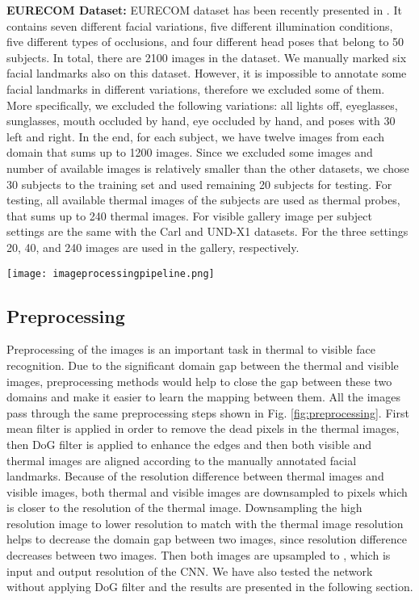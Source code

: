 \documentclass[conference]{IEEEtran}
\begin{document}
\textbf{EURECOM Dataset:} EURECOM dataset has been recently presented in \cite{eurecom}. It contains seven different facial variations, five different illumination conditions, five different types of occlusions, and four different head poses that belong to 50 subjects. In total, there are 2100 images in the dataset. We manually marked six facial landmarks also on this dataset. However, it is impossible to annotate some facial landmarks in different variations, therefore we excluded some of them. More specifically, we excluded the following variations: all lights off, eyeglasses, sunglasses, mouth occluded by hand, eye occluded by hand, and poses with 30 left and right. In the end, for each subject, we have twelve images from each domain that sums up to 1200 images. Since we excluded some images and number of available images is relatively smaller than the other datasets, we chose 30 subjects to the training set and used remaining 20 subjects for testing. For testing, all available thermal images of the subjects are used as thermal probes, that sums up to 240 thermal images. For visible gallery image per subject settings are the same with the Carl and UND-X1 datasets. For the three settings 20, 40, and 240 images are used in the gallery, respectively.
\begin{figure*}[t]
	\centering
	\texttt{[image: imageprocessingpipeline.png]}
	\caption{\label{fig:preprocessing}Preprocessing steps }
\end{figure*}
\subsection{Preprocessing}
Preprocessing of the images is an important task in thermal to visible face recognition. Due to the significant domain gap between the thermal and visible images, preprocessing methods would help to close the gap between these two domains and make it easier to learn the mapping between them. All the images pass through the same preprocessing steps shown in Fig. \ref{fig:preprocessing}. First  mean filter is applied in order to remove the dead pixels in the thermal images, then DoG filter is applied to enhance the edges and then both visible and thermal images are aligned according to the manually annotated facial landmarks. Because of the resolution difference between thermal images and visible images, both thermal and visible images are downsampled to  pixels which is closer to the resolution of the thermal image. Downsampling the high resolution image to lower resolution to match with the thermal image resolution helps to decrease the domain gap between two images, since resolution difference decreases between two images. Then both images are upsampled to , which is input and output resolution of the CNN. We have also tested the network without applying DoG filter and the results are presented in the following section.    
\end{document}
